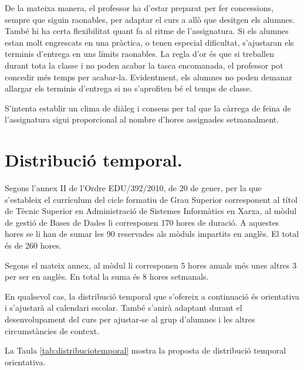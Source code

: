 \documentclass[catalan, a4paper, 12pt, titlepage]{article}
\begin{document}
De la mateixa manera, el professor ha d'estar preparat per fer concessions, sempre que siguin raonables, per adaptar el curs a allò que desitgen els alumnes.
També hi ha certa flexibilitat quant fa al ritme de l'assignatura. 
Si els alumnes estan molt engrescats en una pràctica, o tenen especial dificultat, s'ajustaran els terminis d'entrega en uns límits raonables.
La regla d'or és que si treballen durant tota la classe i no poden acabar la tasca encomanada, el professor pot concedir més temps per acabar-la.
Evidentment, els alumnes no poden demanar allargar els terminis d'entrega si no s'aprofiten bé el temps de classe.

S'intenta establir un clima de diàleg i consens per tal que la càrrega de feina de l'assignatura sigui proporcional al nombre d'hores assignades setmanalment.


\section{Distribució temporal.}
\label{sec:distribució}

Segons l'annex II de l'Ordre EDU/392/2010, de 20 de gener, per la que s'estableix el currículum del cicle formatiu de Grau Superior corresponent al títol de Tècnic Superior en Administració de Sistemes Informàtics en Xarxa, al mòdul de gestió de Bases de Dades li corresponen 170 hores de duració. A aquestes hores se li han de sumar les 90 reservades als mòduls impartits en anglès. El total és de 260 hores.

Segons el mateix annex, al mòdul li corresponen 5 hores anuals més unes altres 3 per ser en anglès. En total la suma és 8 hores setmanals.

En qualsevol cas, la distribució temporal que s'ofereix a continuació és orientativa i s'ajustarà al calendari escolar. També s'anirà adaptant durant el desenvolupament del curs per ajustar-se al grup d'alumnes i les altres circumstàncies de context.

La Taula \ref{tab:distribuciotemporal} mostra la proposta de distribució temporal orientativa.
\end{document}
